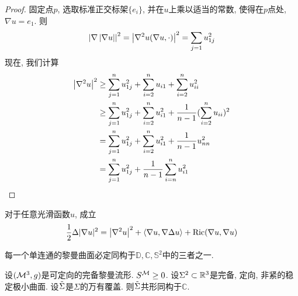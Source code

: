 \begin{proof}
    固定点$p$, 选取标准正交标架$\{e_i\}$, 并在$u$上乘以适当的常数, 使得在$p$点处, $\nabla u = e_1$. 则
    \begin{equation}
        \left | \nabla \left | \nabla u \right | \right |^2 = \left | \nabla^2 u(\nabla u, \cdot) \right |^2 = \sum_{j=1}u_{1j}^2
    \end{equation}
    现在, 我们计算
    \begin{equation}
        \begin{split}
            \left | \nabla^2 u \right |^2 &\ge \sum_{j=1}^nu_{1j}^2+\sum_{i=2}^nu_{i1}+\sum_{i=2}^n u_{ii}^2\\
            &\ge \sum_{j=1}^nu_{1j}^2+\sum_{i=2}^nu_{i1}^2+ \frac{1}{n-1}(\sum_{i=2}^n u_{ii})^2\\
            &= \sum_{j=1}^nu_{1j}^2+\sum_{i=2}^nu_{i1}^2+ \frac{1}{n-1}u_{nn}^2\\
            &= \sum_{j=1}^nu_{1j}^2+\frac{1}{n-1}\sum_{i=n}^nu_{i1}^2
        \end{split}
    \end{equation}
\end{proof}
\begin{lemma}[Bochner公式]
    对于任意光滑函数$u$, 成立
    \begin{equation}
        \frac{1}{2} \Delta|\nabla u|^2=\left | \nabla^2 u \right |^2+\langle\nabla u, \nabla \Delta u\rangle+\operatorname{Ric}(\nabla u, \nabla u)
    \end{equation}
\end{lemma}
\begin{theorem}[单值化定理]\label{uniformization}
    每一个单连通的黎曼曲面必定同构于$\mathbb{D}, \mathbb{C}, \mathbb{S}^2$中的三者之一.
\end{theorem}
\begin{proposition} \label{conformal_c}
    设$({\mathcal{M}}^3,g)$是可定向的完备黎曼流形.  $S^{\mathcal{M}} \ge 0$. 设$\Sigma^2 \subset \mathbb{R}^3$是完备, 定向, 非紧的稳定极小曲面. 设${\tilde{\Sigma}}$是$\Sigma$的万有覆盖.  则${\tilde{\Sigma}}$共形同构于$\mathbb{C}$.
\end{proposition}
